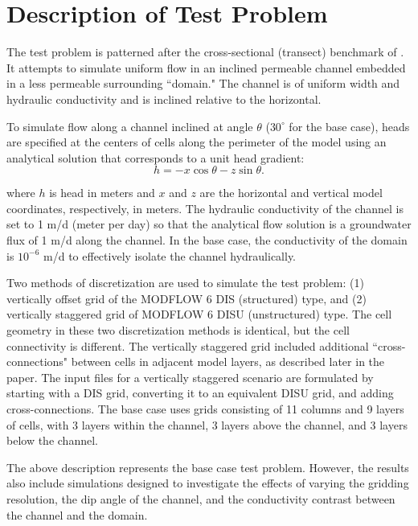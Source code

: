 \documentclass{article}
\begin{document}
\section{Description of Test Problem}

The test problem is patterned after the cross-sectional (transect) benchmark of \cite{bardot2022}. It attempts to simulate uniform flow in an inclined permeable channel embedded in a less permeable surrounding ``domain." The channel is of uniform width and hydraulic conductivity and is inclined relative to the horizontal.

To simulate flow along a channel inclined at angle $\theta$ ($30^{\circ}$ for the base case), heads are specified at the centers of cells along the perimeter of the model using an analytical solution that corresponds to a unit head gradient:
\begin{equation}
\label{eqn:head_analyt_along}
h = - x \cos \theta - z \sin \theta.
\end{equation}

\noindent where $h$ is head in meters and $x$ and $z$ are the horizontal and vertical model coordinates, respectively, in meters. The hydraulic conductivity of the channel is set to 1 m/d (meter per day) so that the analytical flow solution is a groundwater flux of 1 m/d along the channel. In the base case, the conductivity of the domain is $10^{-6}$ m/d to effectively isolate the channel hydraulically.

Two methods of discretization are used to simulate the test problem: (1) vertically offset grid of the MODFLOW 6 DIS (structured) type, and (2) vertically staggered grid of MODFLOW 6 DISU (unstructured) type. The cell geometry in these two discretization methods is identical, but the cell connectivity is different. The vertically staggered grid included additional ``cross-connections" between cells in adjacent model layers, as described later in the paper. The input files for a vertically staggered scenario are formulated by starting with a DIS grid, converting it to an equivalent DISU grid, and adding cross-connections. The base case uses grids consisting of 11 columns and 9 layers of cells, with 3 layers within the channel, 3 layers above the channel, and 3 layers below the channel. 

The above description represents the base case test problem. However, the results also include simulations designed to investigate the effects of varying the gridding resolution, the dip angle of the channel, and the conductivity contrast between the channel and the domain.
\end{document}
